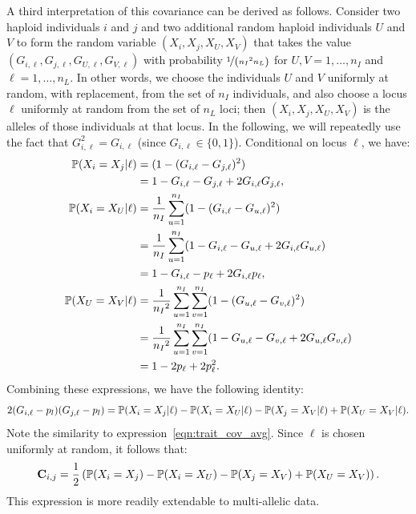 A third interpretation of this covariance can be derived as follows.
%
Consider two haploid individuals $i$ and $j$ and
two additional random haploid individuals $U$ and $V$ to
form the random variable $(X_i, X_j, X_U, X_V)$
that takes the value $(G_{i,\ell}, G_{j,\ell}, G_{U,\ell}, G_{V,\ell})$
with probability $\nicefrac{1}{\left({n_I}^2 n_L\right)}$
for $U, V = 1, \dots, n_I$ and $\ell = 1, \dots, n_L$.
%
In other words, we choose the individuals $U$ and $V$ uniformly at
random, with replacement, from the set of $n_I$ individuals, and
also choose a locus $\ell$ uniformly at random from the set of $n_L$ loci;
then $(X_i, X_j, X_U, X_V)$ is the alleles of those individuals at that locus.
%
In the following, we will repeatedly use the fact that
$G^2_{i,\ell} = G_{i,\ell}$ (since $G_{i,\ell} \in \{0, 1\}$).
%
Conditional on locus $\ell$, we have:
%
\begin{align*}
    \P(X_i = X_j | \ell) &= (1 - (G_{i,\ell} - G_{j,\ell})^2) \\
                         &= 1 - G_{i,\ell} - G_{j,\ell} + 2G_{i,\ell}G_{j,\ell}, \\
    \P(X_i = X_U | \ell) &= \frac{1}{n_I}\sum_{u=1}^{n_I} (1 - (G_{i,\ell} - G_{u,\ell})^2) \\
                         &= \frac{1}{n_I}\sum_{u=1}^{n_I} (1 - G_{i,\ell} - G_{u,\ell} + 2G_{i,\ell}G_{u,\ell}) \\
                         &= 1 - G_{i,\ell} - p_\ell + 2G_{i,\ell}p_\ell, \\
    \P(X_U = X_V | \ell) &= \frac{1}{{n_I}^2}\sum_{u=1}^{n_I}\sum_{v=1}^{n_I} (1 - (G_{u,\ell} - G_{v,\ell})^2) \\
                         &= \frac{1}{{n_I}^2}\sum_{u=1}^{n_I}\sum_{v=1}^{n_I} (1 - G_{u,\ell} - G_{v,\ell} + 2G_{u,\ell}G_{v,\ell}) \\
                         &= 1 - 2p_\ell + 2p^2_\ell.
\end{align*}
%
Combining these expressions, we have the following identity:
%
\[ 2(G_{i,\ell} - p_l)(G_{j,\ell} - p_l) = \P(X_i = X_j | \ell) -
                                           \P(X_i = X_U | \ell) -
                                           \P(X_j = X_V | \ell) +
                                           \P(X_U = X_V | \ell) .\]
%
Note the similarity to expression~\eqref{eqn:trait_cov_avg}.
Since $\ell$ is chosen uniformly at random, it follows that:
%
\small{
\begin{align} \label{eqn:cov_prob}
    \mathbf{C}_{i,j} = \frac{1}{2}\left(\P(X_i = X_j) - \P(X_i = X_U) - \P(X_j = X_V) + \P(X_U = X_V) \right).
\end{align}
}
This expression is more readily extendable to multi-allelic data.

